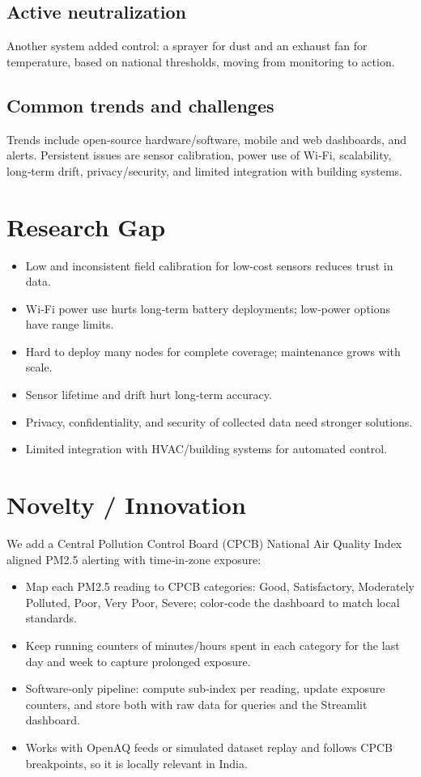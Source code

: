 \documentclass[12pt]{report}
\begin{document}
\subsection{Active neutralization}
Another system added control: a sprayer for dust and an exhaust fan for temperature, based on national thresholds, moving from monitoring to action.

\subsection{Common trends and challenges}
Trends include open‑source hardware/software, mobile and web dashboards, and alerts. Persistent issues are sensor calibration, power use of Wi‑Fi, scalability, long‑term drift, privacy/security, and limited integration with building systems.

\section{Research Gap}
\begin{itemize}
  \item Low and inconsistent field calibration for low‑cost sensors reduces trust in data.
  \item Wi‑Fi power use hurts long‑term battery deployments; low‑power options have range limits.
  \item Hard to deploy many nodes for complete coverage; maintenance grows with scale.
  \item Sensor lifetime and drift hurt long‑term accuracy.
  \item Privacy, confidentiality, and security of collected data need stronger solutions.
  \item Limited integration with HVAC/building systems for automated control.
\end{itemize}

\section{Novelty / Innovation}
We add a Central Pollution Control Board (CPCB) National Air Quality Index aligned PM2.5 alerting with time‑in‑zone exposure:
\begin{itemize}
  \item Map each PM2.5 reading to CPCB categories: Good, Satisfactory, Moderately Polluted, Poor, Very Poor, Severe; color‑code the dashboard to match local standards.
  \item Keep running counters of minutes/hours spent in each category for the last day and week to capture prolonged exposure.
  \item Software‑only pipeline: compute sub‑index per reading, update exposure counters, and store both with raw data for queries and the Streamlit dashboard.
  \item Works with OpenAQ feeds or simulated dataset replay and follows CPCB breakpoints, so it is locally relevant in India.
\end{itemize}
\end{document}
